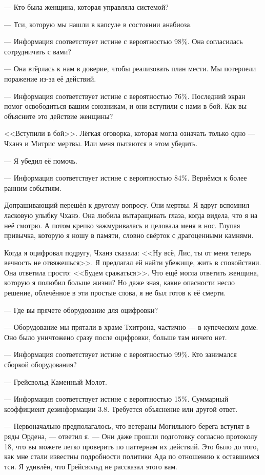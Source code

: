 --- Кто была женщина, которая управляла системой?

--- Тси, которую мы нашли в капсуле в состоянии анабиоза.

--- Информация соответствует истине с вероятностью 98\%.
Она согласилась сотрудничать с вами?

--- Она втёрлась к нам в доверие, чтобы реализовать план мести.
Мы потерпели поражение из-за её действий.

--- Информация соответствует истине с вероятностью 76\%.
Последний экран помог освободиться вашим союзникам, и они вступили с нами в бой.
Как вы объясните это действие женщины?

<<Вступили в бой>>.
Лёгкая оговорка, которая могла означать только одно --- Чханэ и Митрис мертвы.
Или меня пытаются в этом убедить.

--- Я убедил её помочь.

--- Информация соответствует истине с вероятностью 84\%.
Вернёмся к более ранним событиям.

Допрашивающий перешёл к другому вопросу.
Они мертвы.
Я вдруг вспомнил ласковую улыбку Чханэ.
Она любила вытаращивать глаза, когда видела, что я на неё смотрю.
А потом крепко зажмуривалась и целовала меня в нос.
Глупая привычка, которую я ношу в памяти, словно свёрток с драгоценными камнями.

Когда я оцифровал подругу, Чханэ сказала: <<Ну всё, Лис, ты от меня теперь вечность не отвяжешься>>.
Я предлагал ей найти убежище, жить в спокойствии.
Она ответила просто: <<Будем сражаться>>.
Что ещё могла ответить женщина, которую я полюбил больше жизни?
Но даже зная, какие опасности несло решение, облечённое в эти простые слова, я не был готов к её смерти.

--- Где вы прячете оборудование для оцифровки?

--- Оборудование мы прятали в храме Тхитрона, частично --- в купеческом доме.
Оно было уничтожено сразу после оцифровки, больше там ничего нет.

--- Информация соответствует истине с вероятностью 99\%.
Кто занимался сборкой оборудования?

--- Грейсвольд Каменный Молот.

--- Информация соответствует истине с вероятностью 15\%.
Суммарный коэффициент дезинформации $3.8$.
Требуется объяснение или другой ответ.

--- Первоначально предполагалось, что ветераны Могильного берега вступят в ряды Ордена, --- ответил я.
--- Они даже прошли подготовку согласно протоколу 18, что вы можете легко проверить по паттернам их действий.
Это было до того, как мне стали известны подробности политики Ада по отношению к оставшимся тси.
Я удивлён, что Грейсвольд не рассказал этого вам.

